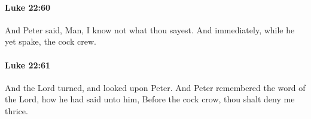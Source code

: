 		\paragraph{Luke 22:60} %
			\label{LUKE-22-60}

			And Peter said, Man, I know not what thou sayest. And immediately, while he yet spake, the cock crew.

			\begin{framed}
			\scriptsize
				\begin{compactdesc}
					\item[SBLG] 
				\end{compactdesc}
			\end{framed}

		\paragraph{Luke 22:61} %
			\label{LUKE-22-61}

			And the Lord turned, and looked upon Peter. And Peter remembered the word of the Lord, how he had said unto him, Before the cock crow, thou shalt deny me thrice.

